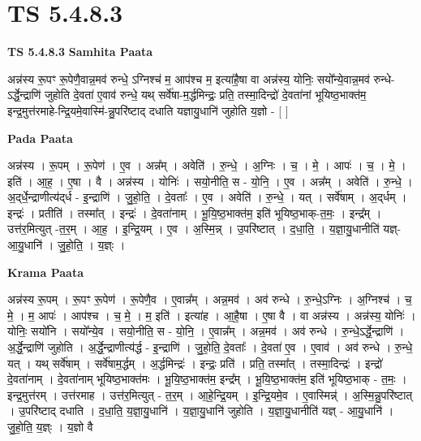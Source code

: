 \documentclass[17pt]{extarticle}
\begin{document}
\section{ TS 5.4.8.3 }

\textbf{TS 5.4.8.3 } \newline
\textbf{Samhita Paata} \newline

अन्न॑स्य रू॒पꣳ रू॒पेणै॒वान्न॒मव॑ रुन्धे॒ ऽग्निश्च॑ म॒ आप॑श्च म॒ इत्या॑है॒षा वा अन्न॑स्य॒ योनिः॒ सयो᳚न्ये॒वान्न॒मव॑ रुन्धे-ऽर्द्धे॒न्द्राणि॑ जुहोति दे॒वता॑ ए॒वाव॑ रुन्धे॒ यथ् सर्वे॑षा-म॒र्द्धमिन्द्रः॒ प्रति॒ तस्मा॒दिन्द्रो॑ दे॒वता॑नां भूयिष्ठ॒भाक्त॑म॒ इन्द्र॒मुत्त॑रमाहे-न्द्रि॒यमे॒वास्मि॑-न्नु॒परि॑ष्टाद् दधाति यज्ञायु॒धानि॑ जुहोति य॒ज्ञो - [  ] \newline

\textbf{Pada Paata} \newline

अन्न॑स्य । रू॒पम् । रू॒पेण॑ । ए॒व । अन्न᳚म् । अवेति॑ । रु॒न्धे॒ । अ॒ग्निः । च॒ । मे॒ । आपः॑ । च॒ । मे॒ । इति॑ । आ॒ह॒ । ए॒षा । वै । अन्न॑स्य । योनिः॑ । सयो॒नीति॒ स - यो॒नि॒ । ए॒व । अन्न᳚म् । अवेति॑ । रु॒न्धे॒ । अ॒द्‌र्धे॒न्द्राणीत्य॑द्‌र्ध - इ॒न्द्राणि॑ । जु॒हो॒ति॒ । दे॒वताः᳚ । ए॒व । अवेति॑ । रु॒न्धे॒ । यत् । सर्वे॑षाम् । अ॒द्‌र्धम् । इन्द्रः॑ । प्रतीति॑ । तस्मा᳚त् । इन्द्रः॑ । दे॒वता॑नाम् । भू॒यि॒ष्ठ॒भाक्त॑म॒ इति॑ भूयिष्ठ॒भाक्-त॒मः॒ । इन्द्र᳚म् । उत्त॑र॒मित्युत् -त॒र॒म् । आ॒ह॒ । इ॒न्द्रि॒यम् । ए॒व । अ॒स्मि॒न्न् । उ॒परि॑ष्टात् । द॒धा॒ति॒ । य॒ज्ञा॒यु॒धानीति॑ यज्ञ्-आ॒यु॒धानि॑ । जु॒हो॒ति॒ । य॒ज्ञ्ः ।  \newline


\textbf{Krama Paata} \newline

अन्न॑स्य रू॒पम् । रू॒पꣳ रू॒पेण॑ । रू॒पेणै॒व । ए॒वान्न᳚म् । अन्न॒मव॑ । अव॑ रुन्धे । रु॒न्धे॒ऽग्निः । अ॒ग्निश्च॑ । च॒ मे॒ । म॒ आपः॑ । आप॑श्च । च॒ मे॒ । म॒ इति॑ । इत्या॑ह । आ॒है॒षा । ए॒षा वै । वा अन्न॑स्य । अन्न॑स्य॒ योनिः॑ । योनिः॒ सयो॑नि । सयो᳚न्ये॒व । सयो॒नीति॒ स - यो॒नि॒ । ए॒वान्न᳚म् । अन्न॒मव॑ । अव॑ रुन्धे । रु॒न्धे॒ऽर्द्धे॒न्द्राणि॑ । अ॒र्द्धे॒न्द्राणि॑ जुहोति । अ॒र्द्धे॒न्द्राणीत्य॑र्द्ध - इ॒न्द्राणि॑ । जु॒हो॒ति॒ दे॒वताः᳚ । दे॒वता॑ ए॒व । ए॒वाव॑ । अव॑ रुन्धे । रु॒न्धे॒ यत् । यथ् सर्वे॑षाम् । सर्वे॑षाम॒र्द्धम् । अ॒र्द्धमिन्द्रः॑ । इन्द्रः॒ प्रति॑ । प्रति॒ तस्मा᳚त् । तस्मा॒दिन्द्रः॑ । इन्द्रो॑ दे॒वता॑नाम् । दे॒वता॑नाम् भूयिष्ठ॒भाक्त॑मः । भू॒यि॒ष्ठ॒भाक्त॑म॒ इन्द्र᳚म् । भू॒यि॒ष्ठ॒भाक्त॑म॒ इति॑ भूयिष्ठ॒भाक् - त॒मः॒ । इन्द्र॒मुत्त॑रम् । उत्त॑रमाह । उत्त॑र॒मित्युत् - त॒र॒म् । आ॒हे॒न्द्रि॒यम् । इ॒न्द्रि॒यमे॒व । ए॒वास्मिन्न्॑ । अ॒स्मि॒न्नु॒परि॑ष्टात् । उ॒परि॑ष्टाद् दधाति । द॒धा॒ति॒ य॒ज्ञा॒यु॒धानि॑ । य॒ज्ञा॒यु॒धानि॑ जुहोति । य॒ज्ञा॒यु॒धानीति॑ यज्ञ् - आ॒यु॒धानि॑ । जु॒हो॒ति॒ य॒ज्ञ्ः । य॒ज्ञो वै \newline
\end{document}
